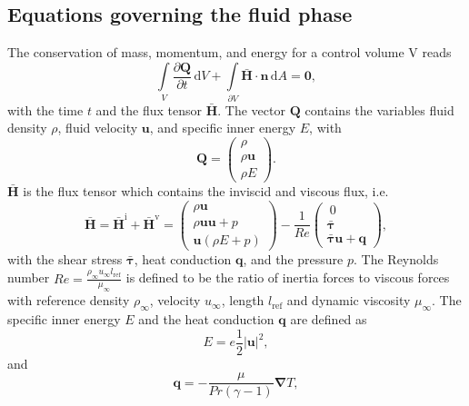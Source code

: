 \documentclass[11pt,a4paper,openany,oneside,parskip=half*]{article}
\renewcommand*\vec[1]{\boldsymbol{#1}}
\renewcommand*\matrix[1]{\boldsymbol{#1}}
\begin{document}
\subsection{Equations governing the fluid phase}
The conservation of mass, momentum, and energy for a control volume V reads
\begin{equation} \label{NavierStokes}
  \int\limits_V \frac{\partial{\vec{Q}}}{\partial{t}} \, \mathrm{d} V+ \int\limits_{\partial{V}} \vec{\bar{H}} \cdot \vec{n} \, \mathrm{d} A = \vec0,
\end{equation}
with the time $t$ and the flux tensor $ \vec{\bar{H}} $.
The vector $ \vec{Q} $ contains the variables fluid density $ \rho $, 
fluid velocity $ \vec{u} $, and specific inner energy $ E $, with 
\begin{equation}
 \vec{Q}= \left( \begin{array}{c}\rho\\\rho \vec{u}\\\rho E \end{array} \right).
\end{equation}
$\vec{\bar{H}} $ is the flux tensor which contains the inviscid and viscous flux, i.e.
\begin{equation} 
\vec{\bar{H}} = \vec{\bar{H}^\mathrm{i}} + \vec{\bar{H}^\mathrm{v}} = 
 \left( \begin{array}{c}\rho \vec{u}\\\rho \vec{u} \vec{u} + p\\\vec{u} (\rho E + p) \end{array} \right) - 
 \frac{1}{Re} \left( \begin{array}{c}\ 0 \\ \matrix{\bar{\tau}}\\ \matrix{\bar{\tau}} \vec{u} + \vec{q} \end{array} \right),
\end{equation} 
with the shear stress $\matrix{\bar{\tau}}$, heat conduction $\vec{q}$, and the pressure $p$. The Reynolds number 
$ Re = \frac{\rho_\infty u_\infty l_\mathrm{ref}}{\mu_\infty} $ is defined to be the ratio of inertia forces to viscous forces with reference density $\rho_\infty$, velocity $u_\infty$, length $l_\mathrm{ref}$ and dynamic viscosity $\mu_\infty$. 
\newline
The specific inner energy $ E $ 
and the heat conduction $ \vec{q}$ are defined as
\begin{equation}
 E = e  \frac{1}{2} \vec{|u|}^2,
\end{equation}
and
\begin{equation}
 \vec{q} = - \frac{\mu}{Pr (\gamma - 1)} \vec\nabla T,
\end{equation}
\end{document}
